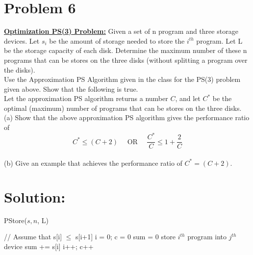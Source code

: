 
\section*{Problem 6}
	\textbf{\underline{Optimization PS(3) Problem:}} Given a set of n program and three storage devices. 
	Let $s_i$ be the amount of storage needed to store the $i^{th}$ program. 
	Let L be the storage capacity of each disk. Determine the maximum number of these n programs that can be stores on the three disks (without splitting a program over the disks).\\
	
	\noindent
	Use the Approximation PS Algorithm given in the class for the PS(3) problem given above. 
	Show that the following is true.\\
	
	\noindent
	Let the approximation PS algorithm returns a number $C$, and let $C^*$ be the optimal (maximum) number of programs that can be stores on the three disks.\\
	(a) Show that the above approximation PS algorithm gives the performance ratio of\[C^* \leq (C+2) \quad\text{ OR }\quad \frac{C^*}{C} \leq 1 + \frac{2}{C}\]\\
	
	\noindent
	(b) Give an example that achieves the performance ratio of $C^* = (C+2)$.
\section*{Solution:}
	\begin{algorithm}[H]
		\caption{PStore($s, n$, L)}
		\begin{algorithmic}[1]
			\State // Assume that s[i] $\leq$ s[i+1] 
			\State i = 0; c = 0 
				\State sum = 0
					\State store $i^{th}$ program into $j^{th}$ device
					\State sum += s[i]
					\State i++; c++
						\State \Return
					\EndIf
				\EndWhile
			\EndFor
		\end{algorithmic}
	\end{algorithm}

